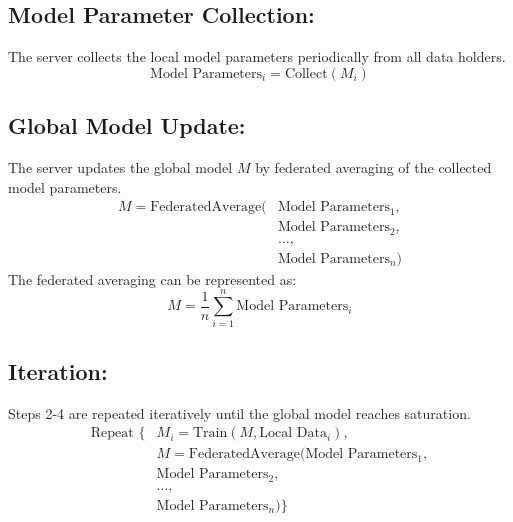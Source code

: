 \documentclass[conference]{IEEEtran}
\begin{document}
\subsection{Model Parameter Collection:}
The server collects the local model parameters periodically from all data holders.
\[ \text{Model Parameters}_i = \text{Collect}(M_i) \]
\subsection{Global Model Update:}
The server updates the global model \(M\) by federated averaging of the collected model parameters.
\begin{align*}
M = \text{FederatedAverage}(&\text{Model Parameters}_1, \\
                           &\text{Model Parameters}_2, \\
                           &\ldots, \\
                           &\text{Model Parameters}_n)
\end{align*}
The federated averaging can be represented as:
\[ M = \frac{1}{n} \sum_{i=1}^{n} \text{Model Parameters}_i \]
\subsection{Iteration:}
Steps 2-4 are repeated iteratively until the global model reaches saturation.
\begin{align*}
\text{Repeat } \{ &M_i = \text{Train}(M, \text{Local Data}_i), \\
                 &M = \text{FederatedAverage}(\text{Model Parameters}_1, \\
                                            &\text{Model Parameters}_2, \\
                                            &\ldots, \\
                                            &\text{Model Parameters}_n) \}
\end{align*}
\end{document}
